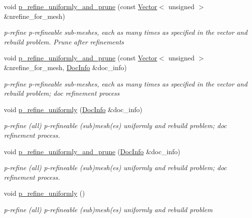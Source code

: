 \begin{DoxyCompactItemize}
void \hyperlink{classoomph_1_1Problem_a5155b2d5436a95b1ee27f914b4eb8f08}{p\+\_\+refine\+\_\+uniformly\+\_\+and\+\_\+prune} (const \hyperlink{classoomph_1_1Vector}{Vector}$<$ unsigned $>$ \&nrefine\+\_\+for\+\_\+mesh)
\begin{DoxyCompactList}\small\item\em p-\/refine p-\/refineable sub-\/meshes, each as many times as specified in the vector and rebuild problem. Prune after refinements \end{DoxyCompactList}\item 
void \hyperlink{classoomph_1_1Problem_aabfa653ef203edf44cf9b6cf558865e1}{p\+\_\+refine\+\_\+uniformly\+\_\+and\+\_\+prune} (const \hyperlink{classoomph_1_1Vector}{Vector}$<$ unsigned $>$ \&nrefine\+\_\+for\+\_\+mesh, \hyperlink{classoomph_1_1DocInfo}{Doc\+Info} \&doc\+\_\+info)
\begin{DoxyCompactList}\small\item\em p-\/refine p-\/refineable sub-\/meshes, each as many times as specified in the vector and rebuild problem; doc refinement process \end{DoxyCompactList}\item 
void \hyperlink{classoomph_1_1Problem_a355caf4c06c3b8b5d399115048453921}{p\+\_\+refine\+\_\+uniformly} (\hyperlink{classoomph_1_1DocInfo}{Doc\+Info} \&doc\+\_\+info)
\begin{DoxyCompactList}\small\item\em p-\/refine (all) p-\/refineable (sub)mesh(es) uniformly and rebuild problem; doc refinement process. \end{DoxyCompactList}\item 
void \hyperlink{classoomph_1_1Problem_a80ff24a4fc923660f2aabfaa763822bf}{p\+\_\+refine\+\_\+uniformly\+\_\+and\+\_\+prune} (\hyperlink{classoomph_1_1DocInfo}{Doc\+Info} \&doc\+\_\+info)
\begin{DoxyCompactList}\small\item\em p-\/refine (all) p-\/refineable (sub)mesh(es) uniformly and rebuild problem; doc refinement process. \end{DoxyCompactList}\item 
void \hyperlink{classoomph_1_1Problem_ada439afd4d195644e53d6bdbc4b00587}{p\+\_\+refine\+\_\+uniformly} ()
\begin{DoxyCompactList}\small\item\em p-\/refine (all) p-\/refineable (sub)mesh(es) uniformly and rebuild problem \end{DoxyCompactList}\item 

\end{DoxyCompactItemize}
